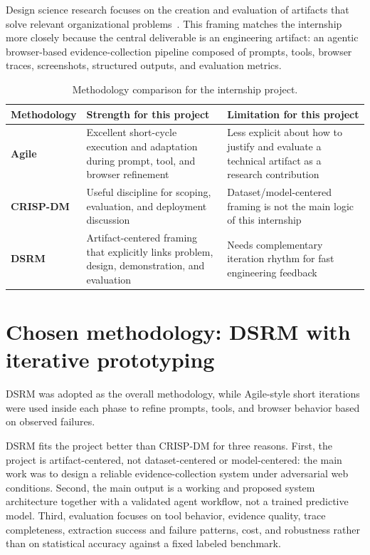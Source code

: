 Design science research focuses on the creation and evaluation of artifacts that solve
relevant organizational problems~\cite{hevner-ds,peffers-dsrm}. This framing matches the
internship more closely because the central deliverable is an engineering artifact: an
agentic browser-based evidence-collection pipeline composed of prompts, tools, browser
traces, screenshots, structured outputs, and evaluation metrics.

\begin{table}[H]
\centering
\begin{tabularx}{\textwidth}{>{\raggedright\arraybackslash\bfseries}p{3cm}
                              >{\raggedright\arraybackslash}X
                              >{\raggedright\arraybackslash}X}
\toprule
\rowcolor{accent!8}
Methodology & Strength for this project & Limitation for this project \\
\midrule
Agile & Excellent short-cycle execution and adaptation during prompt, tool, and
browser refinement & Less explicit about how to justify and evaluate a technical
artifact as a research contribution \\
CRISP-DM & Useful discipline for scoping, evaluation, and deployment discussion &
Dataset/model-centered framing is not the main logic of this internship \\
DSRM & Artifact-centered framing that explicitly links problem, design, demonstration,
and evaluation & Needs complementary iteration rhythm for fast engineering feedback \\
\bottomrule
\end{tabularx}
\caption{Methodology comparison for the internship project.}
\label{tab:method-compare}
\end{table}

\section{Chosen methodology: DSRM with iterative prototyping}

DSRM was adopted as the overall methodology, while Agile-style short iterations were
used inside each phase to refine prompts, tools, and browser behavior based on observed
failures.

DSRM fits the project better than CRISP-DM for three reasons. First, the project is
artifact-centered, not dataset-centered or model-centered: the main work was to design a
reliable evidence-collection system under adversarial web conditions. Second, the main
output is a working and proposed system architecture together with a validated agent
workflow, not a trained predictive model. Third, evaluation focuses on tool behavior,
evidence quality, trace completeness, extraction success and failure patterns, cost, and
robustness rather than on statistical accuracy against a fixed labeled benchmark.

